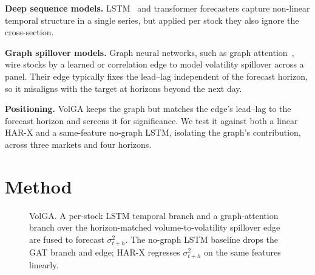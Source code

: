 \documentclass{llncs}
\begin{document}
\textbf{Deep sequence models.} LSTM~\cite{lstm1997} and transformer forecasters capture non-linear temporal
structure in a single series, but applied per stock they also ignore the cross-section.

\textbf{Graph spillover models.} Graph neural networks, such as graph attention~\cite{gat2018}, wire stocks by a
learned or correlation edge to model volatility spillover across a panel. Their edge typically fixes the
lead--lag independent of the forecast
horizon, so it misaligns with the target at horizons beyond the next day.

\textbf{Positioning.} VolGA keeps the graph but matches the edge's lead--lag to the forecast horizon and screens
it for significance. We test it against both a linear HAR-X and a same-feature no-graph LSTM, isolating the
graph's contribution, across three markets and four horizons.

\section{Method}

\begin{figure}[t]
\centering
{}
\caption{VolGA. A per-stock LSTM temporal branch and a graph-attention branch over the horizon-matched
volume-to-volatility spillover edge are fused to forecast $\sigma^2_{t+h}$. The no-graph LSTM baseline drops
the GAT branch and edge; HAR-X regresses $\sigma^2_{t+h}$ on the same features linearly.}
\label{fig:volga}
\end{figure}
\end{document}
